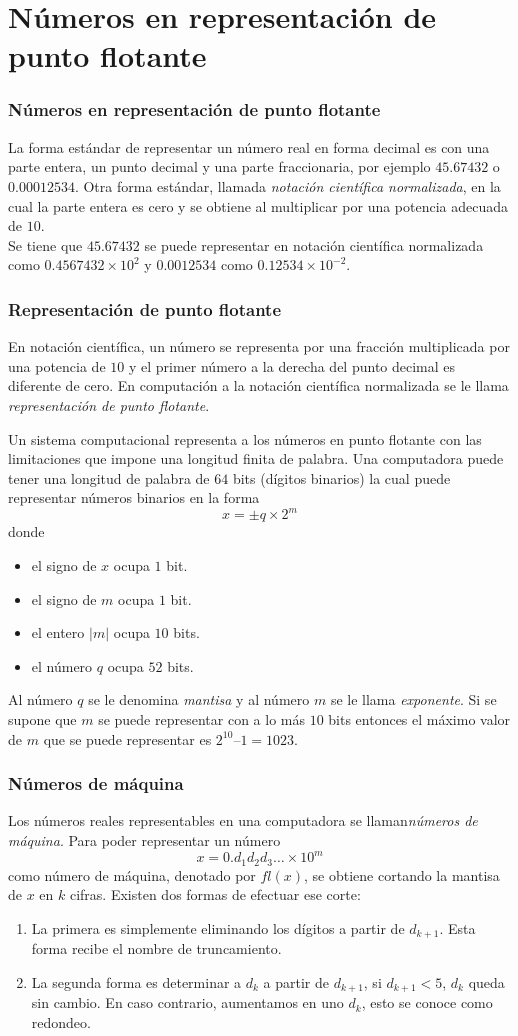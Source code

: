 \section{Números en representación de punto flotante}
\begin{frame}
\frametitle{Números en representación de punto flotante}
La forma estándar de representar un número real en forma decimal es con una parte entera, un punto decimal y una parte fraccionaria, por ejemplo $45.67432$ o $0.00012534$. Otra forma estándar, llamada \emph{notación científica normalizada}, en la cual la parte entera es cero y se obtiene al multiplicar por una potencia adecuada de $10$.
\\
\medskip
Se tiene que $45.67432$ se puede representar en notación científica normalizada como
$0.4567432 \times 10^{2}$ y $0.0012534$ como $0.12534 \times 10^{-2}$.
\end{frame}
\begin{frame}
\frametitle{Representación de punto flotante}
En notación científica, un número se representa por una fracción multiplicada por una potencia de $10$ y el primer número a la derecha del punto decimal es diferente de cero. En computación a la notación científica normalizada se le llama \emph{representación de punto flotante}.
\end{frame}
\begin{frame}
Un sistema computacional representa a los números en punto flotante con las limitaciones que impone una longitud finita de palabra. Una computadora puede tener una longitud de palabra de $64$ bits (dígitos binarios) la cual puede representar números binarios en la forma
\[ x = \pm q \times 2^{m}\]
donde
\begin{itemize}
\item el signo de $x$ ocupa $1$ bit.
\item el signo de $m$ ocupa $1$ bit.
\item el entero $\vert m \vert$ ocupa $10$ bits.
\item el número $q$ ocupa $52$ bits.
\end{itemize}
Al número $q$ se le denomina \emph{mantisa} y al número $m$ se le llama \emph{exponente}. Si se supone que $m$ se puede representar con a lo más $10$ bits entonces el máximo valor de $m$ que se puede representar es $2^{10} – 1 = 1 023$.
\end{frame}
\begin{frame}
\frametitle{Números de máquina}
Los números reales representables en una computadora se llaman\emph{números de máquina}. Para poder representar un número 
\[ x = 0.d_{1} d_{2} d_{3} \ldots \times 10^{m} \]
como número de máquina, denotado por $fl(x)$, se obtiene cortando la mantisa de $x$ en $k$ cifras.
Existen dos formas de efectuar ese corte:
\begin{enumerate}
\item La primera es simplemente eliminando los dígitos a partir de $d_{k+1}$. Esta forma recibe el nombre de truncamiento.
\item La segunda forma es determinar a $d_{k}$ a partir de $d_{k+1}$, si $d_{k+1} < 5$, $d_{k}$ queda sin cambio. En caso contrario, aumentamos en uno $d_{k}$, esto se conoce como redondeo.
\end{enumerate}
\end{frame}
